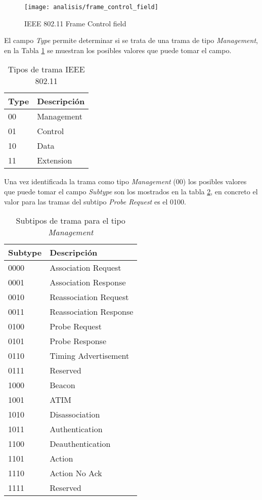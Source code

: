 \documentclass[../proyecto.tex]{subfiles}
\begin{document}
\begin{figure}[H]
\centering
\texttt{[image: analisis/frame\_control\_field]}
\caption{IEEE 802.11 Frame Control field}
\label{fig:ieee80211_frame_control_field}
\end{figure}

El campo \textit{Type} permite determinar si se trata de una trama de tipo \textit{Management}, en la Tabla \ref{table:tipos_trama} se muestran los posibles valores que puede tomar el campo.\\

\begin{table}[h!]
\centering
\begin{tabular}{ |l|m{20em}| }
\hline
\textbf{Type} & \textbf{Descripción} \\
\hline\hline
00  & Management          \\ \hline
01  & Control  \\ \hline
10  & Data \\ \hline
11 & Extension \\ \hline
\end{tabular}
\caption{Tipos de trama IEEE 802.11}
\label{table:tipos_trama}
\end{table}

Una vez identificada la trama como tipo \textit{Management} (00) los posibles valores que puede tomar el campo \textit{Subtype} son los mostrados en la tabla \ref{table:subtipos_trama}, en concreto el valor para las tramas del subtipo \textit{Probe Request} es el 0100.

\begin{table}[h!]
\centering
\begin{tabular}{ |l|m{20em}| }
\hline
\textbf{Subtype} & \textbf{Descripción} \\
\hline\hline
0000  & Association Request  \\ \hline
0001  & Association Response \\ \hline
0010  & Reassociation Request \\ \hline
0011  & Reassociation Response \\ \hline
0100  & Probe Request \\ \hline
0101  & Probe Response \\ \hline
0110  & Timing Advertisement \\ \hline
0111  & Reserved \\ \hline
1000  & Beacon \\ \hline
1001  & ATIM \\ \hline
1010  & Disassociation \\ \hline
1011  & Authentication \\ \hline
1100  & Deauthentication \\ \hline
1101  & Action \\ \hline
1110  & Action No Ack \\ \hline
1111  & Reserved \\ \hline
\end{tabular}
\caption{Subtipos de trama para el tipo \textit{Management}}
\label{table:subtipos_trama}
\end{table}
\end{document}
